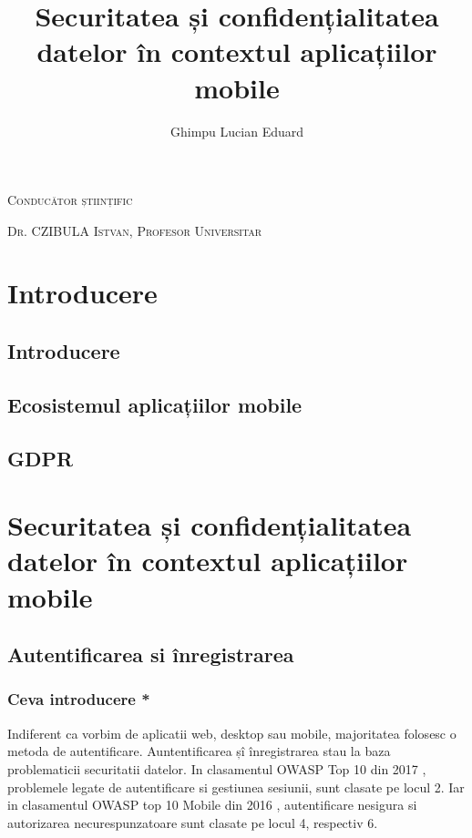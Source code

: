 \documentclass[a4paper]{article}
\begin{document}
\title{Securitatea și confidențialitatea datelor în contextul aplicațiilor mobile}

\author{Ghimpu Lucian Eduard}
\maketitle




\textsc{Conducător științific}

\textsc{Dr. CZIBULA Istvan, Profesor Universitar}

\newpage

\tableofcontents


\section{Introducere}
\subsection{Introducere}
\subsection{Ecosistemul aplicațiilor mobile}
\subsection{GDPR}

\section{Securitatea și confidențialitatea datelor în contextul aplicațiilor mobile}


\subsection{Autentificarea si înregistrarea}
\newpage
\subsubsection{Ceva introducere *}

Indiferent ca vorbim de aplicatii web, desktop sau mobile, majoritatea folosesc 
o metoda de autentificare. Auntentificarea șî înregistrarea stau la baza
problematicii securitatii datelor. In clasamentul OWASP Top 10 din 2017 \cite{owasp-top10-2017}, 
problemele legate de autentificare si gestiunea sesiunii, sunt clasate pe locul 2. Iar in
clasamentul OWASP top 10 Mobile din 2016 \cite{owasp-top10-mobile}, autentificare nesigura
si autorizarea necurespunzatoare sunt clasate pe locul 4, respectiv 6.
\end{document}
